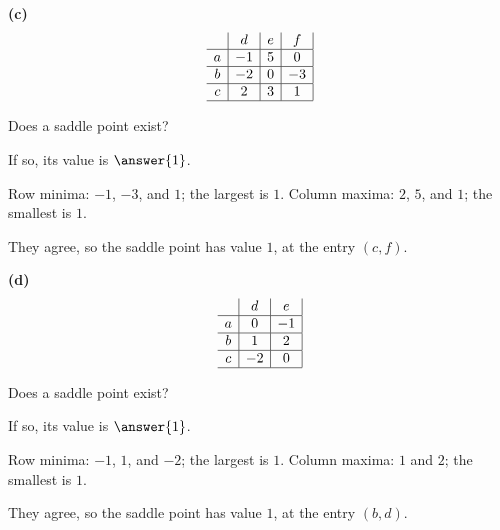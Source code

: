 \documentclass[12pt]{ximera}
\begin{document}
\begin{problem}
\begin{prompt}
\textbf{(c)}
\[
\begin{array}{c|c|c|c|}
\phantom{|} & d & e & f \\\hline
a & -1 & 5 & 0 \\\hline
b & -2 & 0 & -3 \\\hline
c & 2 & 3 & 1 \\\hline
\end{array}
\]

Does a saddle point exist?
\begin{multipleChoice}
\end{multipleChoice}

If so, its value is $\answer{1}$.

\begin{feedback}
Row minima: $-1$, $-3$, and $1$; the largest is $1$.
Column maxima: $2$, $5$, and $1$; the smallest is $1$.

They agree, so the saddle point has value $1$, at the entry $(c,f)$.
\end{feedback}
\end{prompt}

\begin{prompt}
\textbf{(d)}
\[
\begin{array}{c|c|c|}
\phantom{|} & d & e \\\hline
a & 0 & -1 \\\hline
b & 1 & 2 \\\hline
c & -2 & 0 \\\hline
\end{array}
\]

Does a saddle point exist?
\begin{multipleChoice}
\end{multipleChoice}

If so, its value is $\answer{1}$.

\begin{feedback}
Row minima: $-1$, $1$, and $-2$; the largest is $1$.
Column maxima: $1$ and $2$; the smallest is $1$.

They agree, so the saddle point has value $1$, at the entry $(b,d)$.
\end{feedback}
\end{prompt}
\end{problem}
\end{document}
